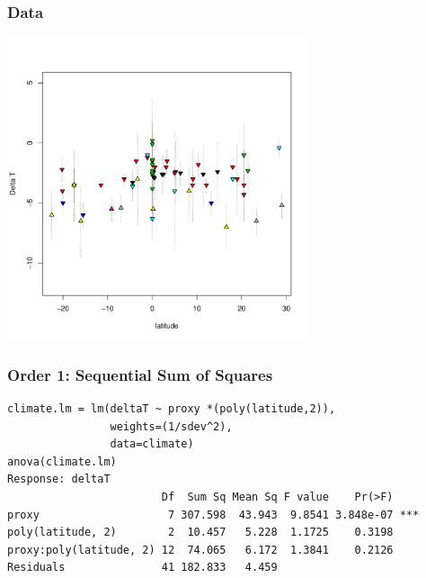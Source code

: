\documentclass[handout]{beamer}
\begin{document}
\begin{frame}
  \frametitle{Data}
\centerline{\includegraphics[height=3.5in]{temp-lat}}
\end{frame}
\begin{frame}[fragile]
  \frametitle{Order 1: Sequential Sum of Squares }
  \begin{small}
\begin{verbatim}
climate.lm = lm(deltaT ~ proxy *(poly(latitude,2)),
                weights=(1/sdev^2), 
                data=climate)
anova(climate.lm)
Response: deltaT
                        Df  Sum Sq Mean Sq F value    Pr(>F)    
proxy                    7 307.598  43.943  9.8541 3.848e-07 ***
poly(latitude, 2)        2  10.457   5.228  1.1725    0.3198    
proxy:poly(latitude, 2) 12  74.065   6.172  1.3841    0.2126    
Residuals               41 182.833   4.459  
\end{verbatim}
    
\end{small}

\end{frame}
\end{document}
